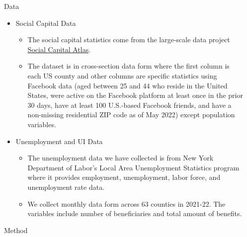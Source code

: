 \documentclass[xcolor=dvipsnames]{beamer} %
\begin{document}
\begin{frame}{}
\begin{columns}[t]
\begin{column}{.3\linewidth}
  \end{column}
  \begin{column}{.3\linewidth}



    \begin{block}{\LARGE Data}
\begin{itemize}
    \item Social Capital Data
    \begin{itemize}
        \item The social capital statistics come from the large-scale data project\href{https://socialcapital.org}{ Social Capital Atlas}. 
        \item The dataset is in cross-section data form where the first column is each US county and other columns are specific statistics using Facebook data (aged between 25 and 44 who reside in the United States, were active on the Facebook platform at least once in the prior 30 days, have at least 100 U.S.-based Facebook friends, and have a non-missing residential ZIP code as of May 2022) except population variables. 
        
    \end{itemize}

    \item  Unemployment and UI Data 

    \begin{itemize}
        \item The unemployment data we have collected is from New York Department of Labor's Local Area Unemployment Statistics program where it provides employment, unemployment, labor force, and unemployment rate data.

        \item We collect monthly data form across 63 counties in 2021-22. The variables include number of beneficiaries and total amount of benefits.

        

    \end{itemize}

\end{itemize}
 
    \end{block}



    \begin{block}{\LARGE Method}


\end{block}
\end{column}
\end{columns}
\end{frame}
\end{document}

